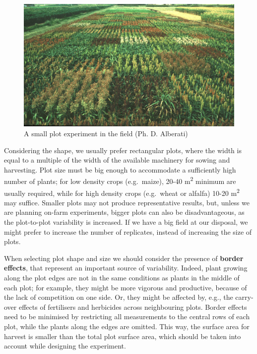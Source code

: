 \documentclass[a4paper,12pt,oneside]{book}
\begin{document}
\begin{figure}

{\centering \includegraphics[width=0.9\linewidth]{_images/SorgoProveVarietali} 

}

\caption{A small plot experiment in the field (Ph. D. Alberati)}\label{fig:figName30b}
\end{figure}

Considering the shape, we usually prefer rectangular plots, where the width is equal to a multiple of the width of the available machinery for sowing and harvesting. Plot size must be big enough to accommodate a sufficiently high number of plants; for low density crops (e.g.~maize), 20-40 m\textsuperscript{2} minimum are usually required, while for high density crops (e.g.~wheat or alfalfa) 10-20 m\textsuperscript{2} may suffice. Smaller plots may not produce representative results, but, unless we are planning on-farm experiments, bigger plots can also be disadvantageous, as the plot-to-plot variability is increased. If we have a big field at our disposal, we might prefer to increase the number of replicates, instead of increasing the size of plots.

When selecting plot shape and size we should consider the presence of \textbf{border effects}, that represent an important source of variability. Indeed, plant growing along the plot edges are not in the same conditions as plants in the middle of each plot; for example, they might be more vigorous and productive, because of the lack of competition on one side. Or, they might be affected by, e.g., the carry-over effects of fertilisers and herbicides across neighbouring plots. Border effects need to be minimised by restricting all measurements to the central rows of each plot, while the plants along the edges are omitted. This way, the surface area for harvest is smaller than the total plot surface area, which should be taken into account while designing the experiment.
\end{document}
